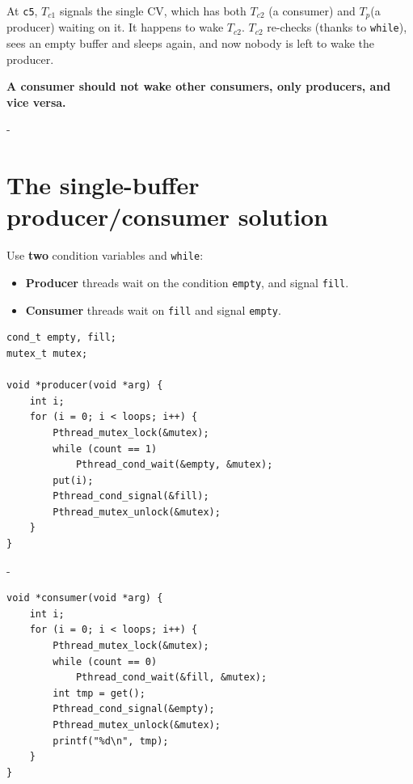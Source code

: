 \documentclass[11pt,a4paper]{article}
\makeatletter
\newcommand{\keepspace}[1]{\par\penalty-100\begingroup
  \setlength{\dimen@}{#1}\dimen@ii\pagegoal\advance\dimen@ii-\pagetotal
  \ifdim\dimen@>\dimen@ii\ifdim\dimen@ii>\z@\vfil\fi\break\fi\endgroup}
\newcommand{\Tc}[1]{\(T_{c#1}\)}
\newcommand{\Tp}{\(T_p\)}
\makeatother
\begin{document}
\begin{warnbox}
At \texttt{c5}, \Tc1 signals the single CV, which has both \Tc2 (a
consumer) and \Tp (a producer) waiting on it. It happens to wake \Tc2.
\Tc2 re-checks (thanks to \texttt{while}), sees an empty buffer and sleeps
again, and now nobody is left to wake the producer.

\textbf{A consumer should not wake other consumers, only producers, and
vice versa.}
\end{warnbox}

\keepspace{24\baselineskip}
\section{The single-buffer producer/consumer solution}

Use \textbf{two} condition variables and \texttt{while}:
\begin{itemize}
  \item \textbf{Producer} threads wait on the condition \texttt{empty}, and
        signal \texttt{fill}.
  \item \textbf{Consumer} threads wait on \texttt{fill} and signal
        \texttt{empty}.
\end{itemize}

\begin{lstlisting}
cond_t empty, fill;
mutex_t mutex;

void *producer(void *arg) {
    int i;
    for (i = 0; i < loops; i++) {
        Pthread_mutex_lock(&mutex);
        while (count == 1)
            Pthread_cond_wait(&empty, &mutex);
        put(i);
        Pthread_cond_signal(&fill);
        Pthread_mutex_unlock(&mutex);
    }
}
\end{lstlisting}

\keepspace{14\baselineskip}
\begin{lstlisting}[firstnumber=16]
void *consumer(void *arg) {
    int i;
    for (i = 0; i < loops; i++) {
        Pthread_mutex_lock(&mutex);
        while (count == 0)
            Pthread_cond_wait(&fill, &mutex);
        int tmp = get();
        Pthread_cond_signal(&empty);
        Pthread_mutex_unlock(&mutex);
        printf("%d\n", tmp);
    }
}
\end{lstlisting}
\end{document}
